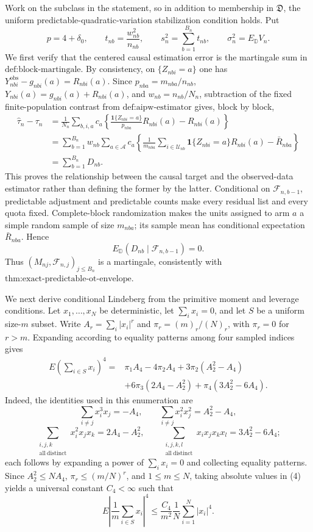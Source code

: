 Work on the subclass in the statement, so in addition to membership in \(\mathfrak D\), the uniform predictable-quadratic-variation stabilization condition holds.  Put
\[
p=4+\delta _0,\qquad t_{nb}=\frac{w_{nb}^{2}}{n_{nb}},\qquad
s_n^2=\sum_{b=1}^{B_n}t_{nb},\qquad \sigma_n^2=E_{\mathbb D}V_n.
\tag{1}
\]
We first verify that the centered causal estimation error is the martingale sum in \(\text{def:block-martingale}\).  By consistency, on \(\{Z_{nbi}=a\}\) one has \(Y_{nbi}^{\mathrm{obs}}-g_{nbi}(a)=R_{nbi}(a)\).  Since \(p_{nba}=m_{nba}/n_{nb}\), \(Y_{nbi}(a)=g_{nbi}(a)+R_{nbi}(a)\), and \(w_{nb}=n_{nb}/N_n\), subtraction of the fixed finite-population contrast from \(\text{def:aipw-estimator}\) gives, block by block,
\[
\begin{aligned}
\widehat\tau_n-\tau_n
&=\frac1{N_n}\sum_{b,i,a}c_a
 \left\{\frac{\mathbf 1\{Z_{nbi}=a\}}{p_{nba}}R_{nbi}(a)-R_{nbi}(a)\right\}\\
&=\sum_{b=1}^{B_n}w_{nb}\sum_{a\in\mathcal A}c_a
 \left\{\frac1{m_{nba}}\sum_{i\in\mathcal U_{nb}}
 \mathbf 1\{Z_{nbi}=a\}R_{nbi}(a)-\bar R_{nba}\right\}\\
&=\sum_{b=1}^{B_n}D_{nb}.
\end{aligned}
\tag{2}
\]
This proves the relationship between the causal target and the observed-data estimator rather than defining the former by the latter.  Conditional on \(\mathcal F_{n,b-1}\), predictable adjustment and predictable counts make every residual list and every quota fixed.  Complete-block randomization makes the units assigned to arm \(a\) a simple random sample of size \(m_{nba}\); its sample mean has conditional expectation \(\bar R_{nba}\).  Hence
\[
E_{\mathbb D}(D_{nb}\mid\mathcal F_{n,b-1})=0.
\tag{3}
\]
Thus \((M_{nj},\mathcal F_{n,j})_{j\le B_n}\) is a martingale, consistently with \(\text{thm:exact-predictable-ot-envelope}\).

We next derive conditional Lindeberg from the primitive moment and leverage conditions.  Let \(x_1,\ldots,x_N\) be deterministic, let \(\sum_i x_i=0\), and let \(S\) be a uniform size-\(m\) subset.  Write \(A_r=\sum_i|x_i|^r\) and \(\pi_r=(m)_r/(N)_r\), with \(\pi_r=0\) for \(r>m\).  Expanding according to equality patterns among four sampled indices gives
\[
\begin{aligned}
E\left(\sum_{i\in S}x_i\right)^4
={}&\pi_1A_4-4\pi_2A_4+3\pi_2(A_2^2-A_4)\\
&+6\pi_3(2A_4-A_2^2)+\pi_4(3A_2^2-6A_4).
\end{aligned}
\tag{4}
\]
Indeed, the identities used in this enumeration are
\[
\sum_{i\ne j}x_i^3x_j=-A_4,
\qquad
\sum_{i\ne j}x_i^2x_j^2=A_2^2-A_4,
\tag{5}
\]
\[
\sum_{\substack{i,j,k\\\mathrm{all\ distinct}}}x_i^2x_jx_k
=2A_4-A_2^2,
\qquad
\sum_{\substack{i,j,k,l\\\mathrm{all\ distinct}}}x_ix_jx_kx_l
=3A_2^2-6A_4;
\tag{6}
\]
each follows by expanding a power of \(\sum_i x_i=0\) and collecting equality patterns.  Since \(A_2^2\le NA_4\), \(\pi_r\le(m/N)^r\), and \(1\le m\le N\), taking absolute values in (4) yields a universal constant \(C_4<\infty\) such that
\[
E\left|\frac1m\sum_{i\in S}x_i\right|^4
\le \frac{C_4}{m^2}\frac1N\sum_{i=1}^N|x_i|^4.
\tag{7}
\]

